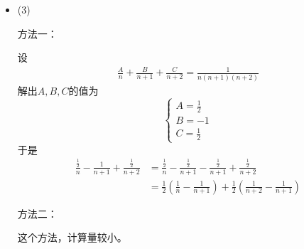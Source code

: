 \documentclass{article}
\begin{document}
\begin{itemize}
  \item (3)

        方法一：

        设
        \begin{align*}
          \frac{A}{n} + \frac{B}{n + 1} + \frac{C}{n + 2} = \frac{1}{n (n + 1)(n + 2)}
        \end{align*}
        解出$A,B,C$的值为
        \begin{equation*}
          \begin{cases}
            A = \frac{1}{2} \\
            B = -1          \\
            C = \frac{1}{2}
          \end{cases}
        \end{equation*}
        于是
        \begin{align*}
          \frac{\frac{1}{2}}{n} - \frac{1}{n + 1} + \frac{\frac{1}{2}}{n + 2}
           & = \frac{\frac{1}{2}}{n} - \frac{\frac{1}{2}}{n + 1} - \frac{\frac{1}{2}}{n + 1} + \frac{\frac{1}{2}}{n + 2} \\
           & = \frac{1}{2}(\frac{1}{n} - \frac{1}{n + 1}) + \frac{1}{2}(\frac{1}{n + 2} - \frac{1}{n + 1})
        \end{align*}

        方法二：

        这个方法，计算量较小。


\end{itemize}
\end{document}
